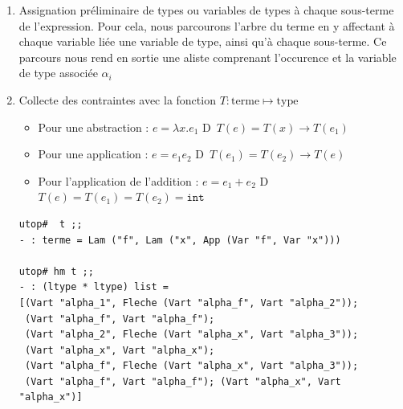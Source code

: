 \documentclass[11pt]{book}
\newcommand{\imp}{{\letterimp D}\hspace{0.1cm}}
\begin{document}
\begin{enumerate}
  \item Assignation préliminaire de types ou variables de types à chaque sous-terme de l'expression.
  Pour cela, nous parcourons  l'arbre du terme en y affectant à chaque variable liée une variable de type, ainsi qu'à
  chaque sous-terme. Ce parcours nous rend en sortie une aliste comprenant l'occurence et la variable de type associée $\alpha_i$
 \begin{center} 
\end{center}



  \item Collecte des contraintes avec la fonction $T: \mathrm{terme} \mapsto \mathrm{type}$ 
    \begin{itemize}
      \item Pour une abstraction :  $e = \lambda x.e_1 $ \imp\ $T(e) = T(x) \rightarrow T(e_1) $
      \item Pour une application :  $e = e_1 e_2$ \imp\ $T(e_1) = T(e_2) \rightarrow T(e) $
      \item Pour l'application de l'addition  : $e=e_1+e_2$ \imp\ $T(e)= T(e_1) = T(e_2) = \mathtt{int} $
    \end{itemize}  


\begin{Verbatim}
utop#  t ;;
- : terme = Lam ("f", Lam ("x", App (Var "f", Var "x")))

utop# hm t ;;
- : (ltype * ltype) list =
[(Vart "alpha_1", Fleche (Vart "alpha_f", Vart "alpha_2"));
 (Vart "alpha_f", Vart "alpha_f");
 (Vart "alpha_2", Fleche (Vart "alpha_x", Vart "alpha_3"));
 (Vart "alpha_x", Vart "alpha_x");
 (Vart "alpha_f", Fleche (Vart "alpha_x", Vart "alpha_3"));
 (Vart "alpha_f", Vart "alpha_f"); (Vart "alpha_x", Vart "alpha_x")]
\end{Verbatim}
    

\end{enumerate}
\end{document}
